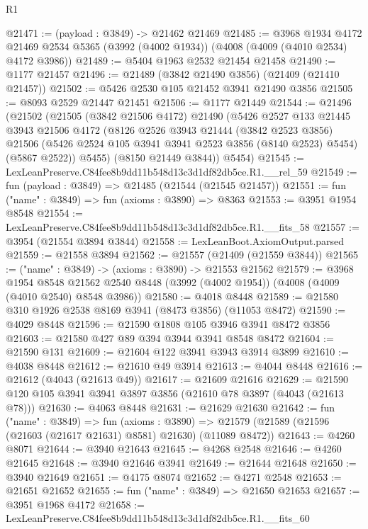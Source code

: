 \begin{lexlean}{R1}
\begin{coremodule}
@21471 := (payload : @3849) -> @21462 @21469
@21485 := @3968
    @1934
    @4172
    @21469
    @2534
    @5365
    (@3992 (@4002 @1934))
    (@4008 (@4009 (@4010 @2534) @4172 @3986))
@21489 := @5404 @1963 @2532 @21454 @21458
@21490 := @1177 @21457
@21496 := @21489 (@3842 @21490 @3856) (@21409 (@21410 @21457))
@21502 := @5426 @2530 @105 @21452 @3941 @21490 @3856
@21505 := @8093 @2529 @21447 @21451
@21506 := @1177 @21449
@21544 := @21496
    (@21502
      (@21505
        (@3842 @21506 @4172)
        @21490
        (@5426
          @2527
          @133
          @21445
          @3943
          @21506
          @4172
          (@8126
            @2526
            @3943
            @21444
            (@3842 @2523 @3856)
            @21506
            (@5426 @2524 @105 @3941 @3941 @2523 @3856 (@8140 @2523) @5454)
            (@5867 @2522))
          @5455)
        (@8150 @21449 @3844))
      @5454)
@21545 := LexLeanPreserve.C84fee8b9dd11b548d13c3d1df82db5ce.R1.__rel_59
@21549 := fun (payload : @3849) => @21485 (@21544 (@21545 @21457))
@21551 := fun ("name" : @3849) => fun (axioms : @3890) => @8363
@21553 := @3951 @1954 @8548
@21554 := LexLeanPreserve.C84fee8b9dd11b548d13c3d1df82db5ce.R1.__fits_58
@21557 := @3954 (@21554 @3894 @3844)
@21558 := LexLeanBoot.AxiomOutput.parsed
@21559 := @21558 @3894
@21562 := @21557 (@21409 (@21559 @3844))
@21565 := ("name" : @3849) -> (axioms : @3890) -> @21553 @21562
@21579 := @3968
    @1954
    @8548
    @21562
    @2540
    @8448
    (@3992 (@4002 @1954))
    (@4008 (@4009 (@4010 @2540) @8548 @3986))
@21580 := @4018 @8448
@21589 := @21580 @310 @1926 @2538 @8169 @3941 (@8473 @3856) (@11053 @8472)
@21590 := @4029 @8448
@21596 := @21590 @1808 @105 @3946 @3941 @8472 @3856
@21603 := @21580 @427 @89 @394 @3944 @3941 @8548 @8472
@21604 := @21590 @131
@21609 := @21604 @122 @3941 @3943 @3914 @3899
@21610 := @4038 @8448
@21612 := @21610 @49 @3914
@21613 := @4044 @8448
@21616 := @21612 (@4043 (@21613 @49))
@21617 := @21609 @21616
@21629 := @21590 @120 @105 @3941 @3941 @3897 @3856 (@21610 @78 @3897 (@4043 (@21613 @78)))
@21630 := @4063 @8448
@21631 := @21629 @21630
@21642 := fun ("name" : @3849) =>
  fun (axioms : @3890) =>
  @21579 (@21589 (@21596 (@21603 (@21617 @21631) @8581) @21630) (@11089 @8472))
@21643 := @4260 @8071
@21644 := @3940 @21643
@21645 := @4268 @2548
@21646 := @4260 @21645
@21648 := @3940 @21646 @3941
@21649 := @21644 @21648
@21650 := @3940 @21649
@21651 := @4175 @8074
@21652 := @4271 @2548
@21653 := @21651 @21652
@21655 := fun ("name" : @3849) => @21650 @21653
@21657 := @3951 @1968 @4172
@21658 := LexLeanPreserve.C84fee8b9dd11b548d13c3d1df82db5ce.R1.__fits_60

\end{coremodule}
\end{lexlean}
